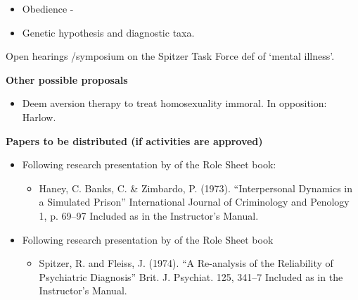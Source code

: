 \begin{refsection}
\begin{itemize}
\begin{itemize}
\item {}

\item {}

\end{itemize}

\item Obedience - 

\item Genetic hypothesis and diagnostic taxa. 

\end{itemize}

Open hearings \slash  symposium on the Spitzer Task Force def of ‘mental illness’. 

\textbf{Other possible proposals}

\begin{itemize}
\item Deem aversion therapy to treat homosexuality immoral. 
In opposition: Harlow.

\end{itemize}

\textbf{Papers to be distributed (if activities are approved)}

\begin{itemize}
\item Following research presentation by  of the Role Sheet book:

\begin{itemize}
\item Haney, C. Banks, C. \& Zimbardo, P. (1973). “Interpersonal Dynamics in a Simulated Prison” International Journal of Criminology and Penology 1, p. 69--97 Included as  in the Instructor's Manual.

\end{itemize}

\item Following research presentation by  of the Role Sheet book

\begin{itemize}
\item Spitzer, R. and Fleiss, J. (1974). “A Re-analysis of the Reliability of Psychiatric Diagnosis” Brit. J. Psychiat. 125, 341--7 Included as  in the Instructor's Manual.


\end{itemize}
\end{itemize}
\end{refsection}
